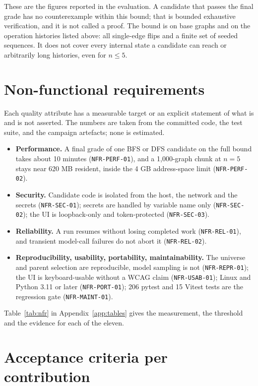 These are the figures reported in the evaluation. A candidate that passes the
final grade has no counterexample within this bound; that is bounded exhaustive
verification, and it is not called a proof. The bound is on base graphs and on
the operation histories listed above: all single-edge flips and a finite set of
seeded sequences. It does not cover every internal state a candidate can reach
or arbitrarily long histories, even for $n \le 5$.

\section{Non-functional requirements}
\label{sec:nfr}

Each quality attribute has a measurable target or an explicit statement of what
is and is not asserted. The numbers are taken from the committed code, the test
suite, and the campaign artefacts; none is estimated.

\begin{itemize}
  \item \textbf{Performance.} A final grade of one BFS or DFS candidate on the
  full bound takes about 10 minutes (\texttt{NFR-PERF-01}), and a 1,000-graph
  chunk at $n = 5$ stays near 620 MB resident, inside the 4 GB address-space limit
  (\texttt{NFR-PERF-02}).
  \item \textbf{Security.} Candidate code is isolated from the host, the
  network and the secrets (\texttt{NFR-SEC-01}); secrets are handled by
  variable name only (\texttt{NFR-SEC-02}); the UI is loopback-only and
  token-protected (\texttt{NFR-SEC-03}).
  \item \textbf{Reliability.} A run resumes without losing completed work
  (\texttt{NFR-REL-01}), and transient model-call failures do not abort it
  (\texttt{NFR-REL-02}).
  \item \textbf{Reproducibility, usability, portability, maintainability.}
  The universe and parent selection are reproducible, model sampling is not
  (\texttt{NFR-REPR-01}); the UI is keyboard-usable without a WCAG claim
  (\texttt{NFR-USAB-01}); Linux and Python 3.11 or later
  (\texttt{NFR-PORT-01}); 206 pytest and 15 Vitest tests are the regression
  gate (\texttt{NFR-MAINT-01}).
\end{itemize}

Table~\ref{tab:nfr} in Appendix~\ref{app:tables} gives the measurement, the
threshold and the evidence for each of the eleven.

\section{Acceptance criteria per contribution}
\label{sec:acceptance}


